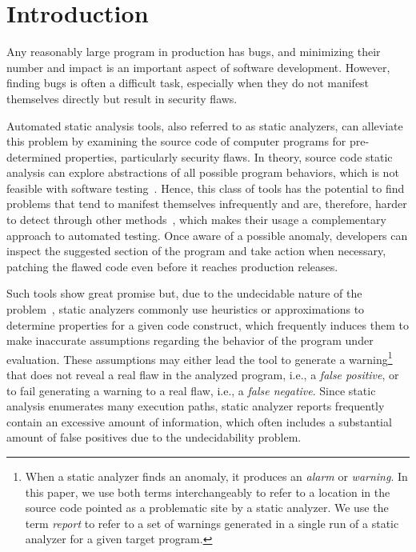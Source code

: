 \chapter{Introduction}
\label{ch:introduction}

Any reasonably large program in production has bugs,
and minimizing their number and impact is an important aspect of software
development. However, finding bugs is often a difficult task, especially when
they do not manifest themselves directly but result in security flaws.

Automated static analysis tools, also referred to as static analyzers, can
alleviate this problem by examining the source code of computer programs for
pre-determined properties, particularly security flaws. In theory, source code
static analysis can explore abstractions of all possible program behaviors,
which is not feasible with software testing~\citep{hovemeyer_finding_2004}.
Hence, this class of tools has the potential to find problems that tend to
manifest themselves infrequently and are, therefore, harder to detect through
other methods~\citep{black2009static}, which makes their usage a complementary
approach to automated testing. Once aware of a possible anomaly, developers can
inspect the suggested section of the program and take action when necessary,
patching the flawed code even before it reaches production releases.

Such tools show great promise but, due to the undecidable nature of the
problem~\citep{landi_undecidability_1992}, static analyzers commonly use
heuristics or approximations to determine properties for a given code
construct, which frequently induces them to make inaccurate assumptions
regarding the behavior of the program under evaluation. These assumptions may
either lead the tool to generate a warning\footnote{When a static analyzer
finds an anomaly, it produces an \emph{alarm} or \emph{warning}. In this paper,
we use both terms interchangeably to refer to a location in the source code
pointed as a problematic site by a static analyzer. We use the term
\emph{report} to refer to a set of warnings generated in a single run of a
static analyzer for a given target program.} that does not reveal a real flaw
in the analyzed program, i.e., a \emph{false positive}, or to fail generating a
warning to a real flaw, i.e., a \emph{false negative}. Since static analysis
enumerates many execution paths, static analyzer reports frequently contain an
excessive amount of information, which often includes a substantial amount of
false positives due to the undecidability problem.

